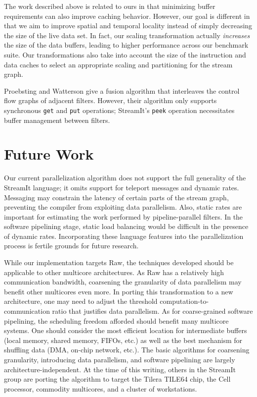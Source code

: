 The work described above is related to ours in that minimizing buffer
requirements can also improve caching behavior.  However, our goal is
different in that we aim to improve spatial and temporal locality
instead of simply decreasing the size of the live data set.  In fact,
our scaling transformation actually {\it increases} the size of the
data buffers, leading to higher performance across our benchmark
suite.  Our transformations also take into account the size of the
instruction and data caches to select an appropriate scaling and
partitioning for the stream graph.

Proebsting and Watterson \cite{pro96} give a fusion algorithm that
interleaves the control flow graphs of adjacent filters.  However,
their algorithm only supports synchronous {\tt get} and {\tt put}
operations; StreamIt's {\tt peek} operation necessitates buffer
management between filters.

\section{Future Work}

Our current parallelization algorithm does not support the full
generality of the StreamIt language; it omits support for teleport
messages and dynamic rates.  Messaging may constrain the latency of
certain parts of the stream graph, preventing the compiler from
exploiting data parallelism.  Also, static rates are important for
estimating the work performed by pipeline-parallel filters.  In the
software pipelining stage, static load balancing would be difficult in
the presence of dynamic rates.  Incorporating these language features
into the parallelization process is fertile grounds for future
research.

While our implementation targets Raw, the techniques developed should
be applicable to other multicore architectures.  As Raw has a
relatively high communication bandwidth, coarsening the granularity of
data parallelism may benefit other multicores even more.  In porting
this transformation to a new architecture, one may need to adjust the
threshold computation-to-communication ratio that justifies data
parallelism.  As for coarse-grained software pipelining, the
scheduling freedom afforded should benefit many multicore systems.
One should consider the most efficient location for intermediate
buffers (local memory, shared memory, FIFOs, etc.) as well as the best
mechanism for shuffling data (DMA, on-chip network, etc.).  The basic
algorithms for coarsening granularity, introducing data parallelism,
and software pipelining are largely architecture-independent.  At the
time of this writing, others in the StreamIt group are porting the
algorithm to target the Tilera TILE64 chip, the Cell processor,
commodity multicores, and a cluster of workstations.

